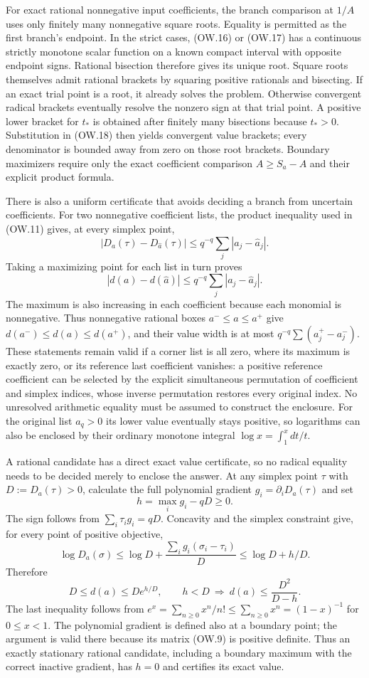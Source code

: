 For exact rational nonnegative input coefficients, the branch
comparison at $1/A$ uses only finitely many nonnegative square roots.
Equality is permitted as the first branch's endpoint. In the strict
cases, (OW.16) or (OW.17) has a continuous strictly monotone scalar
function on a known compact interval with opposite endpoint signs.
Rational bisection therefore gives its unique root. Square roots
themselves admit rational brackets by squaring positive rationals
and bisecting. If an exact trial point is a root, it already solves
the problem. Otherwise convergent radical brackets eventually
resolve the nonzero sign at that trial point. A positive lower
bracket for $t_*$ is obtained after finitely many bisections because
$t_*>0$. Substitution in (OW.18) then yields convergent value
brackets; every denominator is bounded away from zero on those
root brackets. Boundary maximizers require only the exact coefficient
comparison $A\ge S_a-A$ and their explicit product formula.

There is also a uniform certificate that avoids deciding a branch
from uncertain coefficients. For two nonnegative coefficient lists,
the product inequality used in (OW.11) gives, at every simplex point,
\[
 |D_a(\tau)-D_{\widehat a}(\tau)|
       \le q^{-q}\sum_j|a_j-\widehat a_j|.
\]
Taking a maximizing point for each list in turn proves
\[
 \boxed{|d(a)-d(\widehat a)|
       \le q^{-q}\sum_j|a_j-\widehat a_j|.}              \tag{OW.22}
\]
The maximum is also increasing in each coefficient because each
monomial is nonnegative. Thus nonnegative rational boxes
$a^-\le a\le a^+$ give $d(a^-)\le d(a)\le d(a^+)$, and their
value width is at most $q^{-q}\sum(a_j^+-a_j^-)$.
These statements remain valid if a corner list is all zero, where
its maximum is exactly zero, or its reference last coefficient
vanishes: a positive reference coefficient can be selected by the
explicit simultaneous permutation of coefficient and simplex indices,
whose inverse permutation restores every original index. No
unresolved arithmetic equality must be assumed to construct the
enclosure. For the original list $a_q>0$ its lower value eventually
stays positive, so logarithms can also be enclosed by their ordinary
monotone integral $\log x=\int_1^xdt/t$.

A rational candidate has a direct exact value certificate, so no radical
equality needs to be decided merely to enclose the answer. At any simplex
point $\tau$ with $D:=D_a(\tau)>0$, calculate the full polynomial
gradient $g_i=\partial_iD_a(\tau)$ and set
\[
 h=\max_i g_i-qD\ge0.
\]
The sign follows from $\sum_i\tau_i g_i=qD$. Concavity and the
simplex constraint give, for every point of positive objective,
\[
 \log D_a(\sigma)\le\log D+
       \frac{\sum_i g_i(\sigma_i-\tau_i)}D
       \le\log D+h/D.
\]
Therefore
\[
 \boxed{D\le d(a)\le D e^{h/D},\qquad
 h<D\ \Longrightarrow\ d(a)\le\frac{D^2}{D-h}.}         \tag{OW.22a}
\]
The last inequality follows from
$e^x=\sum_{n\ge0}x^n/n!\le\sum_{n\ge0}x^n=(1-x)^{-1}$
for $0\le x<1$. The polynomial gradient is defined also at a
boundary point; the argument is valid there because its matrix
(OW.9) is positive definite. Thus an exactly stationary rational
candidate, including a boundary maximum with the correct inactive
gradient, has $h=0$ and certifies its exact value.

